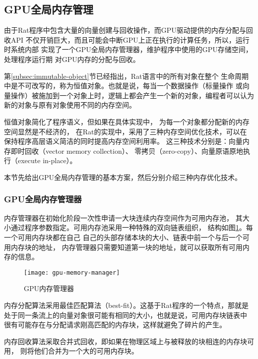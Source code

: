 \subsection{GPU全局内存管理}
由于Rat程序中包含大量的向量创建与回收操作，而GPU驱动提供的内存分配与回收API
不仅开销巨大，而且可能会中断GPU上正在执行的计算任务，所以，运行时系统内部
实现了一个GPU全局内存管理器，维护程序中使用的GPU存储空间，处理程序运行期
对GPU内存的分配与回收。

第\ref{subsec:immutable-object}节已经指出，Rat语言中的所有对象在整个
生命周期中是不可改写的，称为恒值对象。也就是说，每当一个数据操作（标量操作
或向量操作）被施加到一个对象上时，逻辑上都会产生一个新的对象，编程者可以认为
新的对象与原有对象使用不同的内存空间。

恒值对象简化了程序语义，但如果在具体实现中，
为每一个对象都分配新的内存空间显然是不经济的，
在Rat的实现中，采用了三种内存空间优化技术，可以在
保持程序高层语义简洁的同时提高内存空间利用率。
这三种技术分别是：向量内存即时回收（vector memory collection）、
零拷贝（zero-copy）、向量原语原地执行（execute in-place）。

本节先给出GPU全局内存管理的基本方案，然后分别介绍三种内存优化技术。

\subsubsection{GPU全局内存管理器}
内存管理器在初始化阶段一次性申请一大块连续内存空间作为可用内存池，
其大小通过程序参数指定。可用内存池采用一种特殊的双向链表组织，
结构如图\ref{fig:gpu-memory-manager}。每一个可用内存块都在自己
自己的头部存储本块的大小、链表中前一个与后一个可用内存块的地址，
内存管理器只需要知道第一块的地址，就可以获取所有可用内存的信息。
\begin{figure}
  \centering
  \texttt{[image: gpu-memory-manager]}
  \caption{GPU内存管理器}
  \label{fig:gpu-memory-manager}
\end{figure}

内存分配算法采用最佳匹配算法（best-fit）。这基于Rat程序的一个特点，那就是
处于同一条流上的向量对象很可能有相同的大小，也就是说，可用内存块链表中
很有可能存在与分配请求刚高匹配的内存块，这样就避免了碎片的产生。

内存回收算法采取合并式回收，即如果在物理区域上与被释放的块相连的内存块可用，
则将他们合并为一个大的可用内存块。

